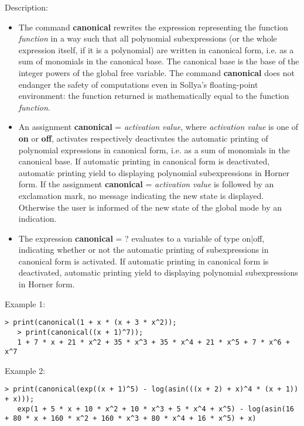 \noindent Description: \begin{itemize}

\item The command \textbf{canonical} rewrites the expression representing the function
   \emph{function} in a way such that all polynomial subexpressions (or the
   whole expression itself, if it is a polynomial) are written in
   canonical form, i.e. as a sum of monomials in the canonical base. The
   canonical base is the base of the integer powers of the global free
   variable. The command \textbf{canonical} does not endanger the safety of
   computations even in Sollya's floating-point environment: the
   function returned is mathematically equal to the function \emph{function}.

\item An assignment \textbf{canonical} = \emph{activation value}, where \emph{activation value}
   is one of \textbf{on} or \textbf{off}, activates respectively deactivates the
   automatic printing of polynomial expressions in canonical form,
   i.e. as a sum of monomials in the canonical base. If automatic
   printing in canonical form is deactivated, automatic printing yield to
   displaying polynomial subexpressions in Horner form.
   If the assignment \textbf{canonical} = \emph{activation value} is followed by an
   exclamation mark, no message indicating the new state is
   displayed. Otherwise the user is informed of the new state of the
   global mode by an indication.

\item The expression \textbf{canonical} = ? evaluates to a variable of type
   \textsf{on|off}, indicating whether or not the automatic printing of
   subexpressions in canonical form is activated. If automatic printing
   in canonical form is deactivated, automatic printing yield to
   displaying polynomial subexpressions in Horner form.
\end{itemize}
\noindent Example 1: 
\begin{center}\begin{minipage}{14.8cm}\begin{Verbatim}[frame=single]
   > print(canonical(1 + x * (x + 3 * x^2));
   > print(canonical((x + 1)^7));
   1 + 7 * x + 21 * x^2 + 35 * x^3 + 35 * x^4 + 21 * x^5 + 7 * x^6 + x^7
\end{Verbatim}
\end{minipage}\end{center}
\noindent Example 2: 
\begin{center}\begin{minipage}{14.8cm}\begin{Verbatim}[frame=single]
   > print(canonical(exp((x + 1)^5) - log(asin(((x + 2) + x)^4 * (x + 1)) + x)));
   exp(1 + 5 * x + 10 * x^2 + 10 * x^3 + 5 * x^4 + x^5) - log(asin(16 + 80 * x + 160 * x^2 + 160 * x^3 + 80 * x^4 + 16 * x^5) + x)
\end{Verbatim}
\end{minipage}\end{center}
